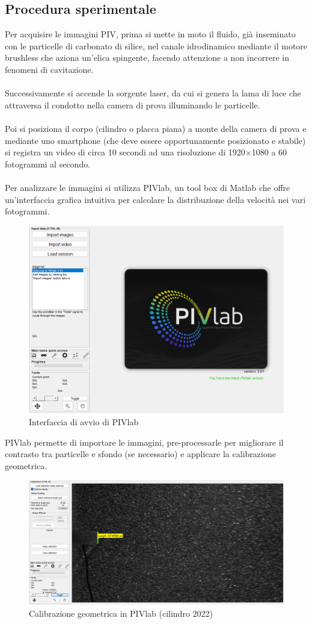 \subsection{Procedura sperimentale}
Per acquisire le immagini PIV, prima si mette in moto il fluido, già inseminato con le particelle di carbonato di silice, nel canale idrodinamico mediante il motore brushless che aziona un'elica spingente, facendo attenzione a non incorrere in fenomeni di cavitazione.\\\\
Successivamente si accende la sorgente laser, da cui si genera la lama di luce che attraversa il condotto nella camera di prova illuminando le particelle.\\\\
Poi si posiziona il corpo (cilindro o placca piana) a monte della camera di prova e mediante uno smartphone (che deve essere opportunamente posizionato e stabile) si registra un video di circa 10 secondi ad una risoluzione di 1920$\times$1080 a 60 fotogrammi al secondo.\\\\
Per analizzare le immagini si utilizza PIVlab, un tool box di Matlab che offre un'interfaccia grafica intuitiva per calcolare la distribuzione della velocità nei vari fotogrammi.
\begin{figure}[H]
    \centering
    \includegraphics[width=.4\textwidth]{images/11/pivlabui.png}
    \caption{Interfaccia di avvio di PIVlab}
\end{figure}

\noindent PIVlab permette di importare le immagini, pre-processarle per migliorare il contrasto tra particelle e sfondo (se necessario) e applicare la calibrazione geometrica.
\begin{figure}[H]
    \centering
    \includegraphics[width=\textwidth]{images/11/pivlabcg.png}
    \caption{Calibrazione geometrica in PIVlab (cilindro 2022)}
\end{figure}

